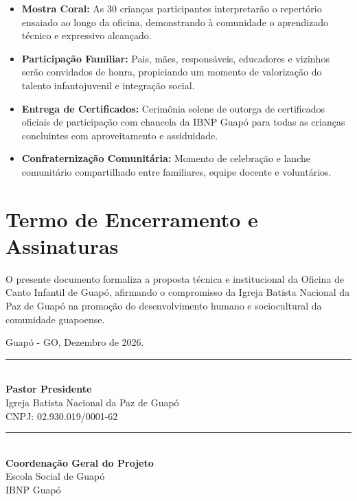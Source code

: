 \documentclass[12pt,a4paper]{article}
\begin{document}
\begin{itemize}
    \item \textbf{Mostra Coral:} As 30 crianças participantes interpretarão o repertório ensaiado ao longo da oficina, demonstrando à comunidade o aprendizado técnico e expressivo alcançado.
    \item \textbf{Participação Familiar:} Pais, mães, responsáveis, educadores e vizinhos serão convidados de honra, propiciando um momento de valorização do talento infantojuvenil e integração social.
    \item \textbf{Entrega de Certificados:} Cerimônia solene de outorga de certificados oficiais de participação com chancela da IBNP Guapó para todas as crianças concluintes com aproveitamento e assiduidade.
    \item \textbf{Confraternização Comunitária:} Momento de celebração e lanche comunitário compartilhado entre familiares, equipe docente e voluntários.
\end{itemize}

\vspace{0.5cm}

\section{Termo de Encerramento e Assinaturas}

O presente documento formaliza a proposta técnica e institucional da Oficina de Canto Infantil de Guapó, afirmando o compromisso da Igreja Batista Nacional da Paz de Guapó na promoção do desenvolvimento humano e sociocultural da comunidade guapoense.

\vspace{1.5cm}

\begin{center}
    Guapó - GO, Dezembro de 2026.
\end{center}

\vspace{1.5cm}

\noindent
\begin{minipage}[t]{0.48\textwidth}
    \centering
    \rule{0.9\textwidth}{0.5pt}\\[0.1cm]
    \textbf{Pastor Presidente}\\
    Igreja Batista Nacional da Paz de Guapó\\
    CNPJ: 02.930.019/0001-62
\end{minipage}
\hfill
\begin{minipage}[t]{0.48\textwidth}
    \centering
    \rule{0.9\textwidth}{0.5pt}\\[0.1cm]
    \textbf{Coordenação Geral do Projeto}\\
    Escola Social de Guapó\\
    IBNP Guapó
\end{minipage}
\end{document}
